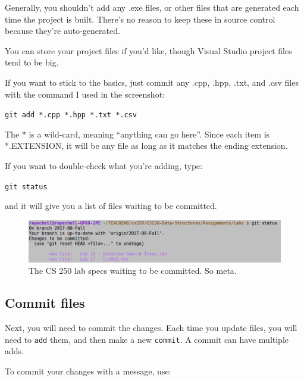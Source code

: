 \documentclass[a4paper,12pt,oneside]{book}
\begin{document}
        Generally, you shouldn't add any .exe files, or other files that are
        generated each time the project is built. There's no reason to keep these
        in source control because they're auto-generated.

        You can store your project files if you'd like, though Visual Studio
        project files tend to be big.

        If you want to stick to the basics, just commit any .cpp, .hpp, .txt,
        and .csv files with the command I used in the screenshot:

        \begin{center}
            \texttt{git add *.cpp *.hpp *.txt *.csv}
        \end{center}

        The * is a wild-card, meaning ``anything can go here''. Since each
        item is *.EXTENSION, it will be any file as long as it matches the
        ending extension.

        If you want to double-check what you're adding, type:

        \begin{center}
            \texttt{git status}
        \end{center}

        and it will give you a list of files waiting to be committed.

        \begin{figure}[h]
            \centering
            \includegraphics[width=14cm]{images/git-status.png}
            \caption{The CS 250 lab specs waiting to be committed. So meta.}
        \end{figure}

        \subsection{Commit files}

        Next, you will need to commit the changes. Each time you update
        files, you will need to \texttt{add} them, and then make a new
        \texttt{commit}. A commit can have multiple adds.

        To commit your changes with a message, use:
\end{document}
